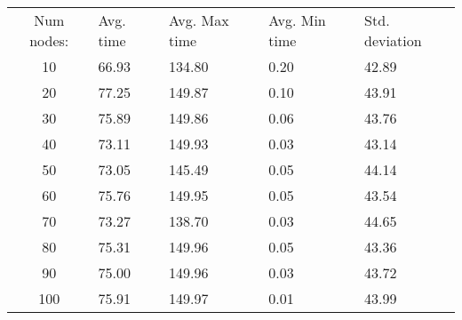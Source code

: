 \begin{tabular}{cllll}
Num nodes: & Avg. time & Avg. Max time & Avg. Min time & Std. deviation \\
10       & 66.93        & 134.80            & 0.20 & 42.89 \\
20       & 77.25        & 149.87            & 0.10 & 43.91 \\
30       & 75.89        & 149.86            & 0.06 & 43.76 \\
40       & 73.11        & 149.93            & 0.03 & 43.14 \\
50       & 73.05        & 145.49            & 0.05 & 44.14 \\
60       & 75.76        & 149.95            & 0.05 & 43.54 \\
70       & 73.27        & 138.70            & 0.03 & 44.65 \\
80       & 75.31        & 149.96            & 0.05 & 43.36 \\
90       & 75.00        & 149.96            & 0.03 & 43.72 \\
100       & 75.91        & 149.97            & 0.01 & 43.99 \\
\end{tabular}